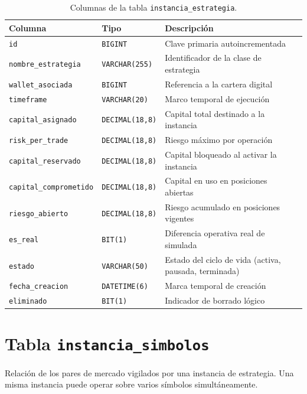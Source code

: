\begin{table}[h]
\centering
\caption{Columnas de la tabla \texttt{instancia\_estrategia}.}
\label{tab:sql-instancia}
\begin{tabular}{@{}llp{5.8cm}@{}}
\toprule
\textbf{Columna} & \textbf{Tipo} & \textbf{Descripción} \\
\midrule
\texttt{id}                   & \texttt{BIGINT}        & Clave primaria autoincrementada \\
\texttt{nombre\_estrategia}   & \texttt{VARCHAR(255)}  & Identificador de la clase de estrategia \\
\texttt{wallet\_asociada}     & \texttt{BIGINT}        & Referencia a la cartera digital \\
\texttt{timeframe}            & \texttt{VARCHAR(20)}   & Marco temporal de ejecución \\
\texttt{capital\_asignado}    & \texttt{DECIMAL(18,8)} & Capital total destinado a la instancia \\
\texttt{risk\_per\_trade}      & \texttt{DECIMAL(18,8)} & Riesgo máximo por operación \\
\texttt{capital\_reservado}   & \texttt{DECIMAL(18,8)} & Capital bloqueado al activar la instancia \\
\texttt{capital\_comprometido}& \texttt{DECIMAL(18,8)} & Capital en uso en posiciones abiertas \\
\texttt{riesgo\_abierto}      & \texttt{DECIMAL(18,8)} & Riesgo acumulado en posiciones vigentes \\
\texttt{es\_real}             & \texttt{BIT(1)}        & Diferencia operativa real de simulada \\
\texttt{estado}               & \texttt{VARCHAR(50)}   & Estado del ciclo de vida (activa, pausada, terminada) \\
\texttt{fecha\_creacion}      & \texttt{DATETIME(6)}   & Marca temporal de creación \\
\texttt{eliminado}            & \texttt{BIT(1)}        & Indicador de borrado lógico \\
\bottomrule
\end{tabular}
\end{table}

\section*{Tabla \texttt{instancia\_simbolos}}

Relación de los pares de mercado vigilados por una instancia de estrategia. Una misma instancia puede operar sobre varios símbolos simultáneamente.

